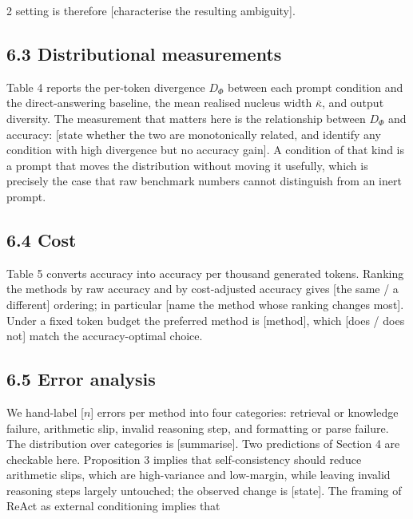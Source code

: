 \documentclass{article}
\begin{document}
\begin{multicols}{2}
setting is therefore \textcolor{BrickRed}{[characterise the resulting ambiguity]}.

\subsection{6.3 Distributional measurements}

Table 4 reports the per-token divergence $D_{\Phi}$ between each prompt condition and the direct-answering baseline, the mean realised nucleus width $\bar{\kappa}$, and output diversity. The measurement that matters here is the relationship between $D_{\Phi}$ and accuracy: \textcolor{BrickRed}{[state whether the two are monotonically related, and identify any condition with high divergence but no accuracy gain]}. A condition of that kind is a prompt that moves the distribution without moving it usefully, which is precisely the case that raw benchmark numbers cannot distinguish from an inert prompt.

\subsection{6.4 Cost}

Table 5 converts accuracy into accuracy per thousand generated tokens. Ranking the methods by raw accuracy and by cost-adjusted accuracy gives \textcolor{BrickRed}{[the same / a different]} ordering; in particular \textcolor{BrickRed}{[name the method whose ranking changes most]}. Under a fixed token budget the preferred method is \textcolor{BrickRed}{[method]}, which \textcolor{BrickRed}{[does / does not]} match the accuracy-optimal choice.

\subsection{6.5 Error analysis}

We hand-label \textcolor{BrickRed}{[$n$]} errors per method into four categories: retrieval or knowledge failure, arithmetic slip, invalid reasoning step, and formatting or parse failure. The distribution over categories is \textcolor{BrickRed}{[summarise]}. Two predictions of Section 4 are checkable here. Proposition 3 implies that self-consistency should reduce arithmetic slips, which are high-variance and low-margin, while leaving invalid reasoning steps largely untouched; the observed change is \textcolor{BrickRed}{[state]}. The framing of ReAct as external conditioning implies that


\end{multicols}
\end{document}
